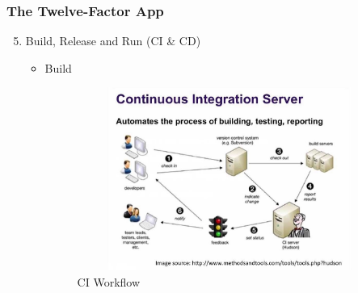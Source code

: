 \documentclass{beamer}
\begin{document}
		\begin{frame}
		\frametitle{The Twelve-Factor App}
			\begin{enumerate}
				\setcounter{enumi}{4}
				\item Build, Release and Run (CI \& CD) \\
				\vspace{2mm}
				\begin{itemize}
					\item {Build}
					\begin{figure}[h]
						\includegraphics[width=100mm,height= 60mm, scale=1]{img/ci.jpeg}
						\caption{CI Workflow}
					\end{figure}
				\end{itemize}
			\end{enumerate}
		\end{frame}
	
\end{document}

